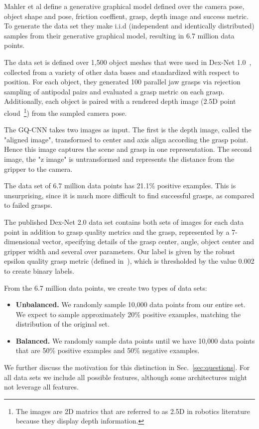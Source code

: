 \documentclass[letterpaper, 10 pt, conference]{../ieeeconf}
\newcommand{\sref}[1]{Sec.~\ref{#1}} %
\begin{document}
Mahler et al define a generative graphical model defined over the camera pose, object shape and pose, friction coeffient, grasp, depth image and success metric. 
To generate the data set they make i.i.d (independent and identically distributed) samples from their generative graphical model, resulting in 6.7 million data points. 

The data set is defined over 1,500 object meshes that were used in Dex-Net 1.0~\cite{mahler2016dex}, collected from a variety of other data bases and standardized with respect to position.
For each object, they generated 100 parallel jaw grasps via rejection sampling of antipodal pairs and evaluated a grasp metric on each grasp. 
Additionally, each object is paired with a rendered depth image (2.5D point cloud~\footnote{The images are 2D matrics that are referred to as 2.5D in robotics literature because they display depth information.}) from the sampled camera pose. 

The GQ-CNN takes two images as input. The first is the depth image, called the "aligned image", transformed to center and axis align according the grasp point. 
Hence this image captures the scene and grasp in one representation. 
The second image, the "z image" is untransformed and represents the distance from the gripper to the camera.

The data set of 6.7 million data points has 21.1\% positive examples. 
This is unsurprising, since it is much more difficult to find successful grasps, as compared to failed grasps. 

The published Dex-Net 2.0 data set contains both sets of images for each data point in addition to grasp quality metrics and the grasp, represented by a 7-dimensional vector, specifying details of the grasp center, angle, object center and gripper width and several over parameters. 
Our label is given by the robust epsilon quality grasp metric (defined in~\cite{seita2016large}), which is thresholded by the value 0.002 to create binary labels.

From the 6.7 million data points, we create two types of data sets:
\begin{itemize}
    \item \textbf{Unbalanced.} We randomly sample 10,000 data points from our entire set. We expect to sample approximately 20\% positive examples, matching the distribution of the original set.
    \item \textbf{Balanced.} We randomly sample data points until we have 10,000 data points that are 50\% positive examples and 50\% negative examples. 
\end{itemize}
We further discuss the motivation for this distinction in \sref{sec:questions}. 
For all data sets we include all possible features, although some architectures might not leverage all features. 
\end{document}
